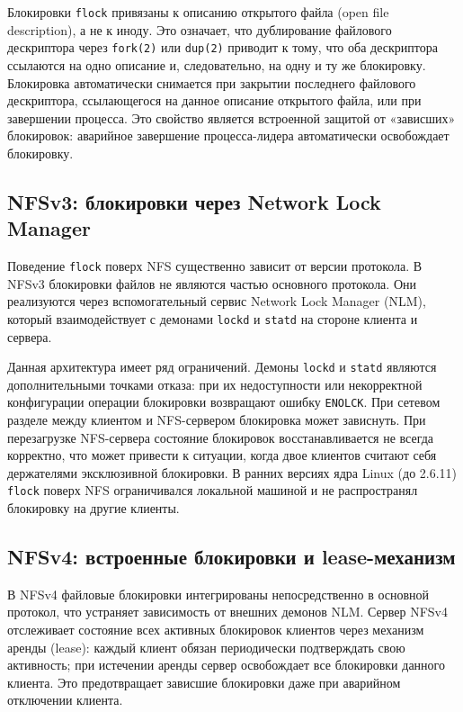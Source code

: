 Блокировки \texttt{flock} привязаны к описанию открытого файла (open file description), а не к иноду. Это означает, что дублирование файлового дескриптора через \texttt{fork(2)} или \texttt{dup(2)} приводит к тому, что оба дескриптора ссылаются на одно описание и, следовательно, на одну и ту же блокировку. Блокировка автоматически снимается при закрытии последнего файлового дескриптора, ссылающегося на данное описание открытого файла, или при завершении процесса. Это свойство является встроенной защитой от «зависших» блокировок: аварийное завершение процесса-лидера автоматически освобождает блокировку.

\subsection*{NFSv3: блокировки через Network Lock Manager}

Поведение \texttt{flock} поверх NFS существенно зависит от версии протокола. В NFSv3 блокировки файлов не являются частью основного протокола. Они реализуются через вспомогательный сервис Network Lock Manager (NLM), который взаимодействует с демонами \texttt{lockd} и \texttt{statd} на стороне клиента и сервера.

Данная архитектура имеет ряд ограничений. Демоны \texttt{lockd} и \texttt{statd} являются дополнительными точками отказа: при их недоступности или некорректной конфигурации операции блокировки возвращают ошибку \texttt{ENOLCK}. При сетевом разделе между клиентом и NFS-сервером блокировка может зависнуть. При перезагрузке NFS-сервера состояние блокировок восстанавливается не всегда корректно, что может привести к ситуации, когда двое клиентов считают себя держателями эксклюзивной блокировки. В ранних версиях ядра Linux (до 2.6.11) \texttt{flock} поверх NFS ограничивался локальной машиной и не распространял блокировку на другие клиенты.

\subsection*{NFSv4: встроенные блокировки и lease-механизм}

В NFSv4 файловые блокировки интегрированы непосредственно в основной протокол, что устраняет зависимость от внешних демонов NLM. Сервер NFSv4 отслеживает состояние всех активных блокировок клиентов через механизм аренды (lease): каждый клиент обязан периодически подтверждать свою активность; при истечении аренды сервер освобождает все блокировки данного клиента. Это предотвращает зависшие блокировки даже при аварийном отключении клиента.

